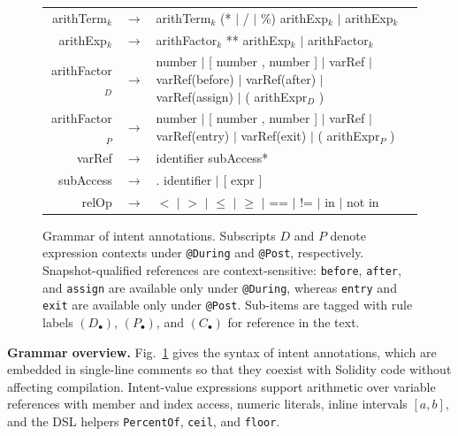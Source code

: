 \documentclass[pdflatex,sn-basic]{sn-jnl}%
\theoremstyle{thmstyleone}%
\theoremstyle{thmstyletwo}%
\theoremstyle{thmstylethree}%
\begin{document}
\begin{figure}[t]
\begin{tabular}{@{}r@{\quad}c@{\quad}l@{\qquad}l@{}}
arithTerm$_k$
  & $\rightarrow$ &
    arithTerm$_k$ (* $|$ / $|$ \%) arithExp$_k$
    $|$ arithExp$_k$ & \\

arithExp$_k$
  & $\rightarrow$ &
    arithFactor$_k$ ** arithExp$_k$
    $|$ arithFactor$_k$ & \\[2pt]

arithFactor$_D$
  & $\rightarrow$ &
    number
    $|$ [ number , number ]
    $|$ varRef
    $|$ varRef(before)
    $|$ varRef(after)
    $|$ varRef(assign)
    $|$ ( arithExpr$_D$ ) & \\

arithFactor$_P$
  & $\rightarrow$ &
    number
    $|$ [ number , number ]
    $|$ varRef
    $|$ varRef(entry)
    $|$ varRef(exit)
    $|$ ( arithExpr$_P$ ) & \\[2pt]

varRef
  & $\rightarrow$ & identifier subAccess* & \\

subAccess
  & $\rightarrow$ & . identifier $|$ [ expr ] & \\[6pt]

relOp
  & $\rightarrow$ &
    $<$ $|$ $>$ $|$ $\leq$ $|$ $\geq$ $|$ == $|$ !=
    $|$ in $|$ not in & \\

\end{tabular}

\caption{Grammar of intent annotations.
Subscripts $D$ and $P$ denote expression contexts under
\texttt{@During} and \texttt{@Post}, respectively.
Snapshot-qualified references are context-sensitive:
\texttt{before}, \texttt{after}, and \texttt{assign} are available only
under \texttt{@During}, whereas \texttt{entry} and \texttt{exit} are
available only under \texttt{@Post}.
Sub-items are tagged with rule labels
$(D_\bullet)$, $(P_\bullet)$, and $(C_\bullet)$ for reference in the text.}
\label{fig:intent-grammar}
\end{figure}

\smallskip
\noindent\textbf{Grammar overview.}
Fig.~\ref{fig:intent-grammar} gives the syntax of intent annotations,
which are embedded in single-line comments so that they coexist with Solidity
code without affecting compilation.
Intent-value expressions support arithmetic over variable references with member
and index access, numeric literals, inline intervals $[a,b]$, and the DSL helpers
\texttt{PercentOf}, \texttt{ceil}, and \texttt{floor}.
\end{document}
